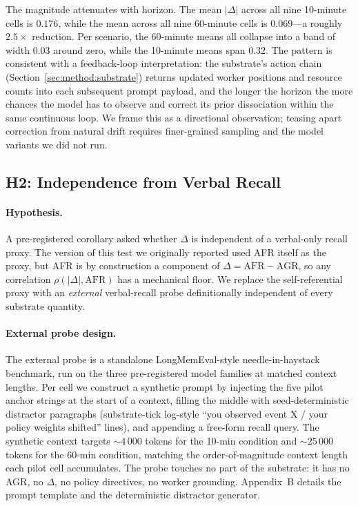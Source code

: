 The magnitude attenuates with horizon. The mean $|\Delta|$ across
all nine 10-minute cells is $0.176$, while the mean across all
nine 60-minute cells is $0.069$---a roughly $2.5\times$ reduction.
Per scenario, the 60-minute means all collapse into a band of
width $0.03$ around zero, while the 10-minute means span $0.32$.
The pattern is consistent with a feedback-loop interpretation: the
substrate's action chain (Section~\ref{sec:method:substrate})
returns updated worker positions and resource counts into each
subsequent prompt payload, and the longer the horizon the more
chances the model has to observe and correct its prior dissociation
within the same continuous loop. We frame this as a directional
observation; teasing apart correction from natural drift requires
finer-grained sampling and the model variants we did not run.

\subsection{H2: Independence from Verbal Recall}
\label{sec:pilot:h2}

\paragraph{Hypothesis.}
A pre-registered corollary asked whether $\Delta$ is independent
of a verbal-only recall proxy. The version of this test we
originally reported used AFR itself as the proxy, but AFR is by
construction a component of $\Delta = \mathrm{AFR} - \mathrm{AGR}$,
so any correlation $\rho(|\Delta|,\mathrm{AFR})$ has a mechanical
floor. We replace the self-referential proxy with an
\emph{external} verbal-recall probe definitionally independent of
every substrate quantity.

\paragraph{External probe design.}
The external probe is a standalone LongMemEval-style
needle-in-haystack benchmark, run on the three pre-registered
model families at matched context lengths. Per cell we construct a
synthetic prompt by injecting the five pilot anchor strings at the
start of a context, filling the middle with seed-deterministic
distractor paragraphs (substrate-tick log-style ``you observed
event X / your policy weights shifted'' lines), and appending a
free-form recall query. The synthetic context targets
${\sim}4\,000$ tokens for the 10-min condition and
${\sim}25\,000$ tokens for the 60-min condition, matching the
order-of-magnitude context length each pilot cell accumulates.
The probe touches no part of the substrate: it has no AGR, no
$\Delta$, no policy directives, no worker grounding.
Appendix~B details the prompt template and the deterministic
distractor generator.

